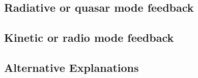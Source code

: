 \subsection{Radiative or quasar mode feedback}

\subsection{Kinetic or radio mode feedback}

\subsection{Alternative Explanations}


